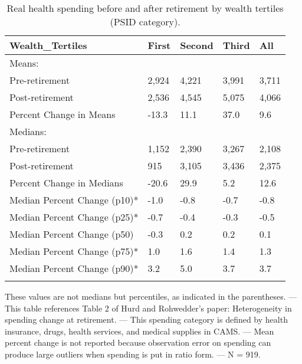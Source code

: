 \begin{table}[tbp] \centering
{}

\caption{Real health spending before and after retirement by wealth tertiles (PSID category).}
\begin{tabularx}{\textwidth}{lCCCC}

\toprule
{Wealth\_Tertiles}&{First}&{Second}&{Third}&{All} \tabularnewline
\midrule\addlinespace[1.5ex]
Means:&&&& \tabularnewline
\midrule Pre-retirement&2,924&4,221&3,991&3,711 \tabularnewline
Post-retirement&2,536&4,545&5,075&4,066 \tabularnewline
Percent Change in Means&-13.3&11.1&37.0&9.6 \tabularnewline
\midrule Medians:&&&& \tabularnewline
\midrule Pre-retirement&1,152&2,390&3,267&2,108 \tabularnewline
Post-retirement&915&3,105&3,436&2,375 \tabularnewline
Percent Change in Medians&-20.6&29.9&5.2&12.6 \tabularnewline
Median Percent Change (p10)*&-1.0&-0.8&-0.7&-0.8 \tabularnewline
Median Percent Change (p25)*&-0.7&-0.4&-0.3&-0.5 \tabularnewline
Median Percent Change (p50)&-0.3&0.2&0.2&0.1 \tabularnewline
Median Percent Change (p75)*&1.0&1.6&1.4&1.3 \tabularnewline
Median Percent Change (p90)*&3.2&5.0&3.7&3.7 \tabularnewline
\bottomrule \addlinespace[1.5ex]

\end{tabularx}
\begin{flushleft}
\footnotesize *These values are not medians but percentiles, as indicated in the parentheses. \linebreak --- \linebreak This table references Table 2 of Hurd and Rohwedder's paper: Heterogeneity in spending change at retirement. \linebreak --- \linebreak This spending category is defined by health insurance, drugs, health services, and medical supplies in CAMS. \linebreak --- \linebreak Mean percent change is not reported because observation error on spending can produce large outliers when spending is put in ratio form. \linebreak --- \linebreak N = 919.
\end{flushleft}
\end{table}

